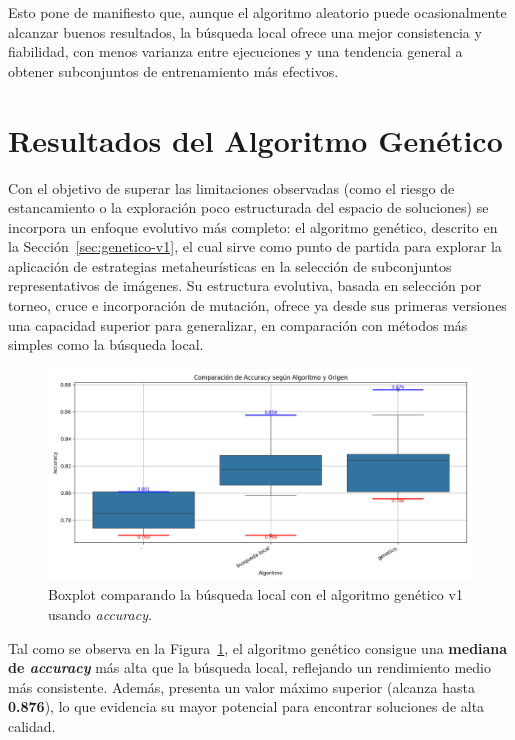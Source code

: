 Esto pone de manifiesto que, aunque el algoritmo aleatorio puede ocasionalmente alcanzar buenos resultados,
la búsqueda local ofrece una mejor consistencia y fiabilidad, con menos varianza entre ejecuciones y una tendencia general a obtener subconjuntos de entrenamiento más efectivos.


\section{Resultados del Algoritmo Genético}\label{sec:resultados-algoritmo-genetico}
Con el objetivo de superar las limitaciones observadas (como el riesgo de estancamiento o la exploración poco estructurada del espacio de soluciones)
se incorpora un enfoque evolutivo más completo: el algoritmo genético, descrito en la Sección~\ref{sec:genetico-v1}, el cual sirve como punto de partida para explorar la
aplicación de estrategias metaheurísticas en la selección de subconjuntos representativos de imágenes.
Su estructura evolutiva, basada en selección por torneo, cruce e incorporación de mutación,
ofrece ya desde sus primeras versiones una capacidad superior para generalizar, en comparación con métodos más simples como la búsqueda local.

\begin{figure}[htp]
    \centering
    \includegraphics[width=1\textwidth]{imagenes/evaluaciones/comparacion_bl-gen_v1}
    \caption{Boxplot comparando la búsqueda local con el algoritmo genético v1 usando \textit{accuracy}.}
    \label{fig:bl-vs-gen-v1}
\end{figure}

Tal como se observa en la Figura~\ref{fig:bl-vs-gen-v1}, el algoritmo genético consigue una \textbf{mediana de \textit{accuracy}} más alta que la búsqueda local,
reflejando un rendimiento medio más consistente.
Además, presenta un valor máximo superior (alcanza hasta \textbf{0.876}), lo que evidencia su mayor potencial para encontrar soluciones de alta calidad.


